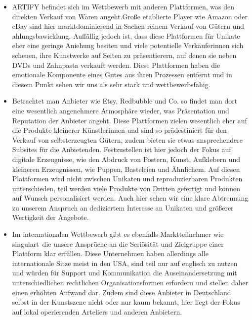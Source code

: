 \documentclass[11pt,a4paper]{report}
\begin{document}
\begin{itemize}
    \item ARTIFY befindet sich im Wettbewerb mit anderen Plattformen, was den direkten Verkauf von Waren angeht.Große etablierte Player wie Amazon oder eBay sind hier marktdominierend in Sachen reinem Verkauf von Gütern und ahlungsbawicklung. Auffällig jedoch ist, dass diese Plattformen für Unikate eher eine geringe Aniehung besiten und viele potentielle Verkäuferinnen sich scheuen, ihre Kunstwerke auf Seiten zu präsentierern, auf denen sie neben DVDs und Zahnpasta verkauft werden. Diese Plattformen haben die emotionale Komponente eines Gutes aus ihren Prozessen entfernt und in diesem Punkt sehen wir uns als sehr stark und wettbewerbsfähig.
    \item Betrachtet man Anbieter wie Etsy, Redbubble und Co. so findet man dort eine wesentlich angenehmere Atmosphäre wieder, was Präsentation und Reputation der Anbieter angeht. Diese Plattformen zielen wesentlich eher auf die Produkte kleinerer Künstlerinnen und sind so prädestiniert für den Verkauf von selbsterzeugten Gütern, zudem bieten sie etwas ansprechendere Subsites für die Anbietenden. Festzustellen ist hier jedoch der Fokus auf digitale Erzeugnisse, wie den Abdruck von Postern, Kunst, Aufklebern und kleineren Erzeugnissen, wie Puppen, Basteleien und Ähnlichem. Auf diesen Plattformen wird nicht zwischen Unikaten und reproduzierbaren Produkten unterschieden, teil werden viele Produkte von Dritten gefertigt und können auf Wunsch personalisiert werden. Auch hier sehen wir eine klare Abtrennung zu unserem Anspruch an dediziertem Interesse an Unikaten und größerer Wertigkeit der Angebote.
    \item Im internationalen Wettbewerb gibt es ebenfalls Marktteilnehmer wie \glqq singulart\grqq \ die unsere Ansprüche an die Seriösität und Zielgruppe einer Plattform klar erfüllen. Diese Unternehmen haben allerdings alle internationale Sitze meist in den USA, sind teil nur auf englisch zu nutzen und würden für Support und Kommunikation die Auseinandersetzung mit unterschiedlichen rechtlichen Organisationsformen erfordern und stellen daher einen erhöhten Aufwand dar. Zudem sind diese Anbieter in Deutschland selbst in der Kunstszene nicht oder nur kaum bekannt, hier liegt der Fokus auf lokal operierenden Arteliers und anderen Anbietern.
    \end{itemize}
   
\end{document}
